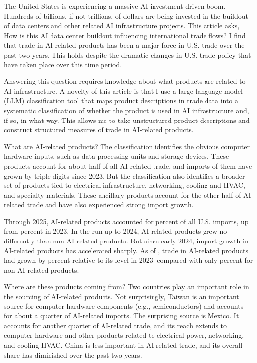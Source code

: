 \documentclass[12pt,pdftex]{article}
\begin{document}
\begin{onehalfspacing}
\hspace{-0.05cm}

\newpage

The United States is experiencing a massive AI-investment-driven boom. Hundreds of billions, if not trillions, of dollars are being invested in the buildout of data centers and other related AI infrastructure projects. This article asks, How is this AI data center buildout influencing international trade flows? I find that trade in AI-related products has been a major force in U.S. trade over the past two years. This holds despite the dramatic changes in U.S. trade policy that have taken place over this time period. 

Answering this question requires knowledge about what products are related to AI infrastructure. A novelty of this article is that I use a large language model (LLM) classification tool that maps product descriptions in trade data into a systematic classification of whether the product is used in AI infrastructure and, if so, in what way. This allows me to take unstructured product descriptions and construct structured measures of trade in AI-related products.

What are AI-related products? The classification identifies the obvious computer hardware inputs, such as data processing units and storage devices. These products account for about half of all AI-related trade, and imports of them have grown by triple digits since 2023. But the classification also identifies a broader set of products tied to electrical infrastructure, networking, cooling and HVAC, and specialty materials. These ancillary products account for the other half of AI-related trade and have also experienced strong import growth.

Through 2025, AI-related products accounted for \aiShareTwentyFive{} percent of all U.S. imports, up from \aiShareTwentyThree{} percent in 2023. In the run-up to 2024, AI-related products grew no differently than non-AI-related products. But since early 2024, import growth in AI-related products has accelerated sharply. As of \lastObsDate{}, trade in AI-related products had grown by \totalHighAiPctChange{} percent relative to its level in 2023, compared with only \lowAiPctChange{} percent for non-AI-related products.

Where are these products coming from? Two countries play an important role in the sourcing of AI-related products. Not surprisingly, Taiwan is an important source for computer hardware components (e.g., semiconductors) and accounts for about a quarter of AI-related imports. The surprising source is Mexico. It accounts for another quarter of AI-related trade, and its reach extends to computer hardware and other products related to electrical power, networking, and cooling HVAC. China is less important in AI-related trade, and its overall share has diminished over the past two years. 


\end{onehalfspacing}
\end{document}
